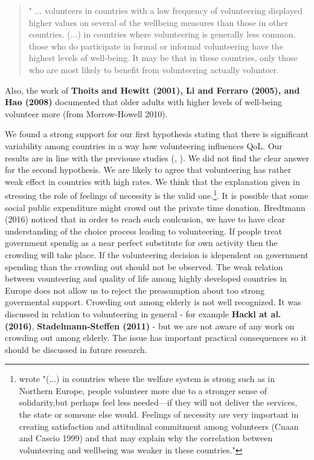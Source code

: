 \documentclass[10pt, letterpaper]{article}
\begin{document}
\begin{spacing}{1.4}
\begin{quote}
" ... volunteers in countries with a low frequency of volunteering displayed higher values on several of the wellbeing measures than those in other countries. (...) in countries where volunteering is generally less common, those who do participate in formal or informal volunteering have the highest levels of well-being. It may be that in these countries, only those who are most likely to benefit from volunteering actually volunteer. 
\end{quote}

Also, the work of \textbf{Thoits and Hewitt (2001), Li and Ferraro (2005), and Hao (2008)} documented that older adults with higher levels of well-being volunteer more (from Morrow-Howell 2010).

We found a strong support for our first hypothesis stating that there is significant variability among countries in a way how volunteering influences QoL.  Our results are in line with the previouse studies (\citet{haski09}, \citet{plagnol10}). We did not find the clear answer for the second hypothesis. We are likely to agree that volunteering has rather weak effect in countries with high rates. We think that the explanation given in \citet{haski09} stressing the role of feelings of necessity is the valid one.\footnote{\citet{haski09} wrote "(...) in countries where the welfare system is strong such as in Northern Europe, people volunteer more due to a stronger sense of solidarity,but perhaps feel less needed—if they will not deliver the services, the state or someone else would. Feelings of necessity are very important in creating satisfaction and attitudinal commitment among volunteers (Cnaan and Cascio 1999) and that may explain why the correlation between volunteering and wellbeing was weaker in these countries."}. It is possible that some social public expenditure might crowd out the private time donation. Bredtmann (2016) noticed that in order to reach such  conlcusion, we have to have clear understanding of the choice process leading to volunteering. If people treat government spendig as a near perfect substitute for own activity then the crowding will take place. If the volunteering decision is idependent on government spending than the crowding out should not be observed. The weak relation between vounteering and quality of life among highly developed countries in Europe does not allow us to reject the preasumption about too strong govermental support. Crowding out among elderly is not well recognized. It was discussed in relation to volunteering in general - for example \textbf{Hackl at al. (2016)}, \textbf{Stadelmann-Steffen (2011)} -  but we are not aware of any work on crowding out among elderly. The issue has important practical consequences so it should be discussed in future research.     


\end{spacing}
\end{document}
